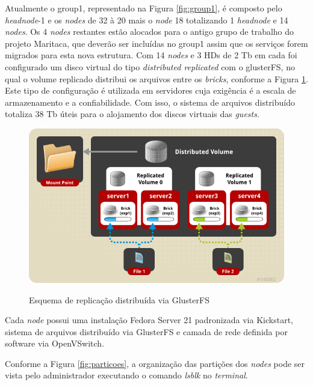 Atualmente o group1, representado na Figura \ref{fig:group1}, é composto pelo \textit{headnode}-1 e os \textit{nodes} de 32 à 20 mais o \textit{node} 18 totalizando 1 \textit{headnode} e 14 \textit{nodes}. Os 4 \textit{nodes} restantes estão alocados para o antigo grupo de trabalho do projeto Maritaca, que deverão ser incluídas no group1 assim que os serviços forem migrados para esta nova estrutura. Com 14 \textit{nodes} e 3 HDs de 2 Tb em cada foi configurado um disco virtual do tipo \textit{distributed replicated} com o glusterFS, no qual o volume replicado distribui os arquivos entre os \textit{bricks}, conforme a Figura \ref{fig:drv_gluster}. Este tipo de configuração é utilizada em servidores cuja exigência é a escala de armazenamento e a confiabilidade.  Com isso, o sistema de arquivos distribuído totaliza 38 Tb úteis para o alojamento dos discos virtuais das \textit{guests}.

    \begin{figure}[htb]
    \centering
    \includegraphics[scale=0.6]{imagens/Distributed_Replicated_Volume.png}
    \caption{Esquema de replicação distribuída via GlusterFS} \cite{Chandrashekar2015}
    \label{fig:drv_gluster}
    \end{figure}



Cada \textit{node} possui uma instalação Fedora Server 21 padronizada via Kickstart, sistema de arquivos distribuído via GlusterFS e camada de rede definida por software via OpenVSwitch.

Conforme a Figura \ref{fig:particoes}, a organização das partições dos \textit{nodes} pode ser vista pelo administrador executando o comando \textit{lsblk} no \textit{terminal}.

